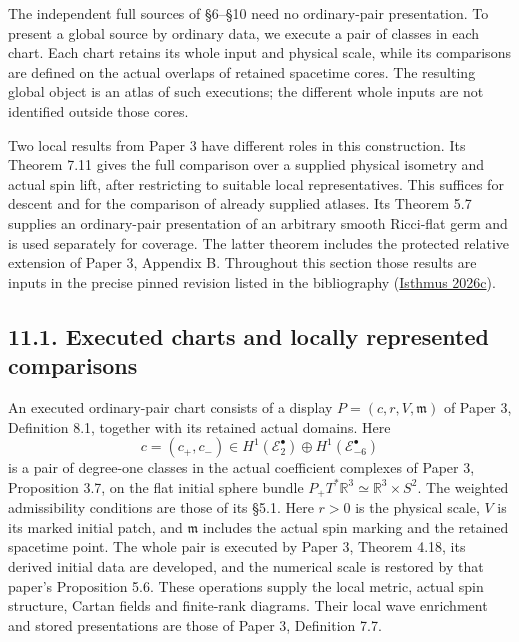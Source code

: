 \documentclass[
  english,
  11pt,
  reqno]{amsart}
\begin{document}
The independent full sources of §6--§10 need no ordinary-pair
presentation. To present a global source by ordinary data, we execute a
pair of classes in each chart. Each chart retains its whole input and
physical scale, while its comparisons are defined on the actual overlaps
of retained spacetime cores. The resulting global object is an atlas of
such executions; the different whole inputs are not identified outside
those cores.

Two local results from Paper 3 have different roles in this
construction. Its Theorem 7.11 gives the full comparison over a supplied
physical isometry and actual spin lift, after restricting to suitable
local representatives. This suffices for descent and for the comparison
of already supplied atlases. Its Theorem 5.7 supplies an ordinary-pair
presentation of an arbitrary smooth Ricci-flat germ and is used
separately for coverage. The latter theorem includes the protected
relative extension of Paper 3, Appendix B. Throughout this section those
results are inputs in the precise pinned revision listed in the
bibliography (\hyperref[ref-IsthmusSmooth2026]{Isthmus 2026c}).

\protect{}\label{sec:ordinary-atlas-local-comparisons}

\subsection{11.1. Executed charts and locally represented
comparisons}\label{executed-charts-and-locally-represented-comparisons}

An executed ordinary-pair chart consists of a display
\(P=(c,r,V,\mathfrak m)\) of Paper 3, Definition 8.1, together with its
retained actual domains. Here \[
c=(c_+,c_-)
\in H^1(\mathscr E_2^\bullet)
\oplus H^1(\mathscr E_{-6}^\bullet)
\] is a pair of degree-one classes in the actual coefficient complexes
of Paper 3, Proposition 3.7, on the flat initial sphere bundle
\(P_+T^*\mathbb R^3\simeq\mathbb R^3\times S^2\). The weighted
admissibility conditions are those of its §5.1. Here \(r>0\) is the
physical scale, \(V\) is its marked initial patch, and \(\mathfrak m\)
includes the actual spin marking and the retained spacetime point. The
whole pair is executed by Paper 3, Theorem 4.18, its derived initial
data are developed, and the numerical scale is restored by that paper's
Proposition 5.6. These operations supply the local metric, actual spin
structure, Cartan fields and finite-rank diagrams. Their local wave
enrichment and stored presentations are those of Paper 3, Definition
7.7.
\end{document}
